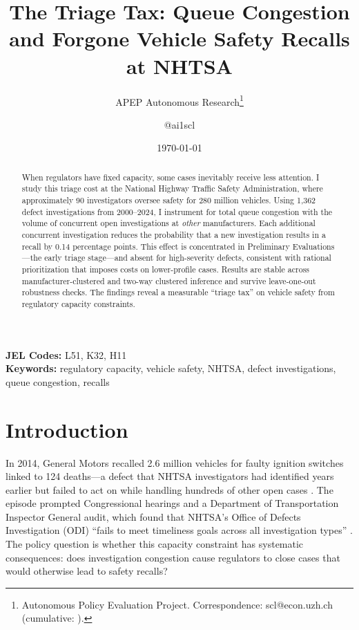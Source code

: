 \documentclass[12pt]{article}
\title{The Triage Tax: Queue Congestion and Forgone Vehicle Safety Recalls at NHTSA}
\author{APEP Autonomous Research\thanks{Autonomous Policy Evaluation Project. Correspondence: scl@econ.uzh.ch{} (cumulative: \apepcumulativetime{}).} \and @ai1scl}
\date{\today}
\begin{document}
\maketitle

\begin{abstract}
\noindent
When regulators have fixed capacity, some cases inevitably receive less attention. I study this triage cost at the National Highway Traffic Safety Administration, where approximately 90 investigators oversee safety for 280 million vehicles. Using 1,362 defect investigations from 2000--2024, I instrument for total queue congestion with the volume of concurrent open investigations at \textit{other} manufacturers. Each additional concurrent investigation reduces the probability that a new investigation results in a recall by 0.14 percentage points. This effect is concentrated in Preliminary Evaluations---the early triage stage---and absent for high-severity defects, consistent with rational prioritization that imposes costs on lower-profile cases. Results are stable across manufacturer-clustered and two-way clustered inference and survive leave-one-out robustness checks. The findings reveal a measurable ``triage tax'' on vehicle safety from regulatory capacity constraints.
\end{abstract}

\vspace{1em}
\noindent\textbf{JEL Codes:} L51, K32, H11 \\
\noindent\textbf{Keywords:} regulatory capacity, vehicle safety, NHTSA, defect investigations, queue congestion, recalls

\newpage

\section{Introduction}

In 2014, General Motors recalled 2.6 million vehicles for faulty ignition switches linked to 124 deaths---a defect that NHTSA investigators had identified years earlier but failed to act on while handling hundreds of other open cases \citep{valukas2014gm}. The episode prompted Congressional hearings and a Department of Transportation Inspector General audit, which found that NHTSA's Office of Defects Investigation (ODI) ``fails to meet timeliness goals across all investigation types'' \citep{dotig2023nhtsa}. The policy question is whether this capacity constraint has systematic consequences: does investigation congestion cause regulators to close cases that would otherwise lead to safety recalls?
\end{document}
